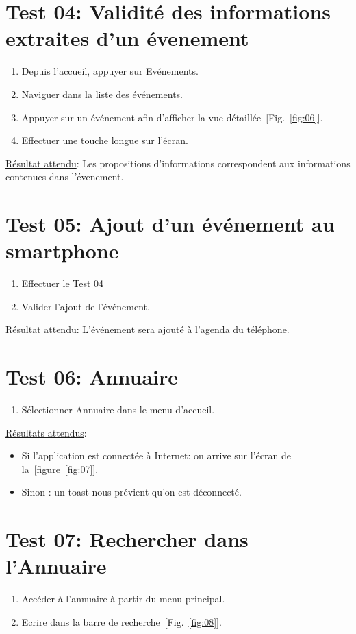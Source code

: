 \documentclass [pdftex,12pt] {report}
\begin{document}
  \section{Test 04: Validité des informations extraites d'un évenement}
    \begin{enumerate}
    \item Depuis l'accueil, appuyer sur Evénements.
    \item Naviguer dans la liste des événements.
    \item Appuyer sur un événement afin d'afficher la vue détaillée~[Fig.~\ref{fig:06}].
    \item Effectuer une touche longue sur l'écran.
    \end{enumerate}

    \underline{Résultat attendu}: Les propositions d'informations correspondent aux informations contenues dans l'évenement.

  \section{Test 05: Ajout d'un événement au smartphone}
    \begin{enumerate}
    \item Effectuer le Test 04
    \item Valider l'ajout de l'événement.
    \end{enumerate}

    \underline{Résultat attendu}: L'événement sera ajouté à l'agenda du téléphone.


  \section{Test 06: Annuaire}
    \begin{enumerate}
    \item Sélectionner Annuaire dans le menu d'accueil.
    \end{enumerate}

    \underline{Résultats attendus}:
    \begin{itemize}
    \item Si l'application est connectée à Internet: on arrive sur l'écran de la~[figure~\ref{fig:07}].
    \item Sinon : un toast nous prévient qu'on est déconnecté.
    \end{itemize}

  \section{Test 07: Rechercher dans l'Annuaire}
    \begin{enumerate}
    \item Accéder à l'annuaire à partir du menu principal.
    \item Ecrire dans la barre de recherche~[Fig.~\ref{fig:08}].
    \end{enumerate}
\end{document}
